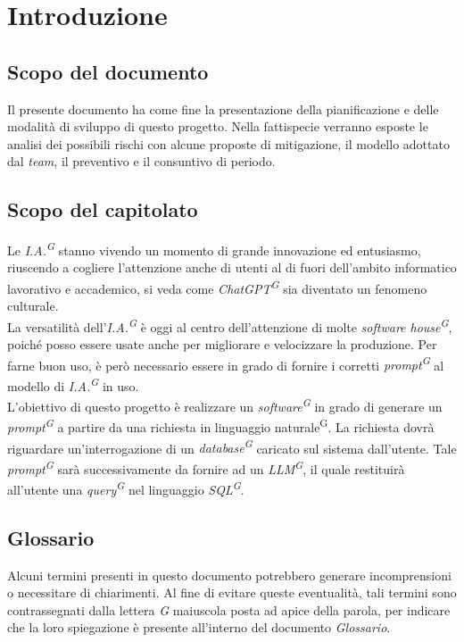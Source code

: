 \documentclass[5pt]{article}
\begin{document}
\pagebreak
\tableofcontents
\pagebreak

\section{Introduzione}
  \subsection{Scopo del documento}
    Il presente documento ha come fine la presentazione della pianificazione e delle modalità di sviluppo di questo progetto. 
    Nella fattispecie verranno esposte le analisi dei possibili rischi con alcune proposte di mitigazione, il modello adottato dal \textit{team}, 
    il preventivo e il consuntivo di periodo.

  \subsection{Scopo del capitolato}
    Le \textit{I.A.\textsuperscript{G}} stanno vivendo un momento di grande innovazione ed entusiasmo, 
    riuscendo a cogliere l'attenzione anche di utenti al di fuori dell'ambito informatico lavorativo e accademico, 
    si veda come \textit{ChatGPT\textsuperscript{G}} sia diventato un fenomeno culturale. \\
    La versatilità dell'\textit{I.A.\textsuperscript{G}} è oggi al centro dell'attenzione di molte \textit{software house\textsuperscript{G}}, 
    poiché posso essere usate anche per migliorare e velocizzare la produzione. 
    Per farne buon uso, è però necessario essere in grado di fornire i corretti \textit{prompt\textsuperscript{G}} al 
    modello di \textit{I.A.\textsuperscript{G}} in uso. \\


    L'obiettivo di questo progetto è realizzare un \textit{software\textsuperscript{G}} in grado di generare 
    un \textit{prompt\textsuperscript{G}} a partire da una richiesta in linguaggio naturale\textsuperscript{G}. La richiesta dovrà riguardare un'interrogazione 
    di un \textit{database\textsuperscript{G}} caricato sul sistema dall'utente. Tale \textit{prompt\textsuperscript{G}} sarà successivamente da fornire 
    ad un \textit{LLM\textsuperscript{G}}, il quale restituirà all'utente una \textit{query\textsuperscript{G}} nel linguaggio 
    \textit{SQL\textsuperscript{G}}.

  \subsection{Glossario}
    Alcuni termini presenti in questo documento potrebbero generare incomprensioni o necessitare di chiarimenti. 
    Al fine di evitare queste eventualità, tali termini sono contrassegnati dalla lettera \textit{G} maiuscola posta ad apice della parola, 
    per indicare che la loro spiegazione è presente all'interno del documento \textit{Glossario}.
\end{document}
